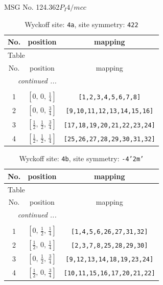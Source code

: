 \documentclass[fleqn,8pt]{jsarticle}
\begin{document}
\setcounter{MaxMatrixCols}{32}

\renewcommand{\tablename}{Table~}
\renewcommand{\figurename}{Figure~}
\begin{center}
\LARGE
MSG No. 124.362\quad$P_{I}4/mcc$
\end{center}
\renewcommand{\arraystretch}{1.2}
\begin{longtable}{ccc}
\caption{Wyckoff site: {\tt 4a}, site symmetry: {\tt 422}}
 \\
 \hline \hline
No. & position & mapping \\ \hline \endfirsthead

\multicolumn{2}{l}{\tablename\ \thetable{}} \\
 \hline \hline
No. & position & mapping \\ \hline \endhead

 \hline \hline
\multicolumn{2}{r}{\footnotesize\it continued ...} \\ \endfoot

 \hline \hline
\multicolumn{2}{r}{} \\ \endlastfoot

1 & $\left[ 0,\, 0,\, \frac{1}{4} \right]$ & {\tt [1,2,3,4,5,6,7,8]} \\ \hline
2 & $\left[ 0,\, 0,\, \frac{3}{4} \right]$ & {\tt [9,10,11,12,13,14,15,16]} \\ \hline
3 & $\left[ \frac{1}{2},\, \frac{1}{2},\, \frac{3}{4} \right]$ & {\tt [17,18,19,20,21,22,23,24]} \\ \hline
4 & $\left[ \frac{1}{2},\, \frac{1}{2},\, \frac{1}{4} \right]$ & {\tt [25,26,27,28,29,30,31,32]} \\
\end{longtable}
\renewcommand{\arraystretch}{1.2}
\begin{longtable}{ccc}
\caption{Wyckoff site: {\tt 4b}, site symmetry: {\tt -4'2m'}}
 \\
 \hline \hline
No. & position & mapping \\ \hline \endfirsthead

\multicolumn{2}{l}{\tablename\ \thetable{}} \\
 \hline \hline
No. & position & mapping \\ \hline \endhead

 \hline \hline
\multicolumn{2}{r}{\footnotesize\it continued ...} \\ \endfoot

 \hline \hline
\multicolumn{2}{r}{} \\ \endlastfoot

1 & $\left[ 0,\, \frac{1}{2},\, \frac{1}{4} \right]$ & {\tt [1,4,5,6,26,27,31,32]} \\ \hline
2 & $\left[ \frac{1}{2},\, 0,\, \frac{1}{4} \right]$ & {\tt [2,3,7,8,25,28,29,30]} \\ \hline
3 & $\left[ 0,\, \frac{1}{2},\, \frac{3}{4} \right]$ & {\tt [9,12,13,14,18,19,23,24]} \\ \hline
4 & $\left[ \frac{1}{2},\, 0,\, \frac{3}{4} \right]$ & {\tt [10,11,15,16,17,20,21,22]} \\
\end{longtable}
\end{document}
